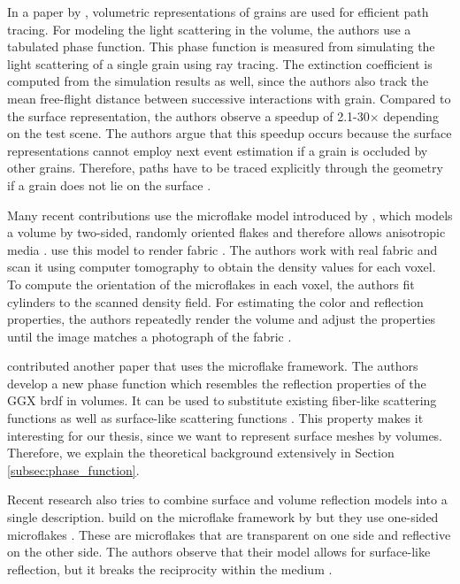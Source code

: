 In a paper by \citeauthor{meng_multi_scale_modeling_and_rendering_of_granular_materials}, volumetric representations of grains are used for efficient path tracing.
For modeling the light scattering in the volume, the authors use a tabulated phase function.
This phase function is measured from simulating the light scattering of a single grain using ray tracing.
The extinction coefficient is computed from the simulation results as well, since the authors also track the mean free-flight distance between successive interactions with grain.
Compared to the surface representation, the authors observe a speedup of 2.1-30$\times$ depending on the test scene.
The authors argue that this speedup occurs because the surface representations cannot employ next event estimation if a grain is occluded by other grains.
Therefore, paths have to be traced explicitly through the geometry if a grain does not lie on the surface \cite{meng_multi_scale_modeling_and_rendering_of_granular_materials}.

Many recent contributions use the microflake model introduced by \citeauthor{microflake}, which models a volume by two-sided, randomly oriented flakes and therefore allows anisotropic media \cite{microflake}.
\citeauthor{zhao_building_volumetric_appearance_models} use this model to render fabric \cite{zhao_building_volumetric_appearance_models}.
The authors work with real fabric and scan it using computer tomography to obtain the density values for each voxel.
To compute the orientation of the microflakes in each voxel, the authors fit cylinders to the scanned density field.
For estimating the color and reflection properties, the authors repeatedly render the volume and adjust the properties until the image matches a photograph of the fabric \cite{zhao_building_volumetric_appearance_models}.

\citeauthor{sggx} contributed another paper that uses the microflake framework.
The authors develop a new phase function which resembles the reflection properties of the GGX \ac{brdf} in volumes.
It can be used to substitute existing fiber-like scattering functions as well as surface-like scattering functions \cite{sggx}.
This property makes it interesting for our thesis, since we want to represent surface meshes by volumes.
Therefore, we explain the theoretical background extensively in Section \ref{subsec:phase_function}.

Recent research also tries to combine surface and volume reflection models into a single description.
\citeauthor{dupuy_unification_of_microfacet_and_microflake} build on the microflake framework by \citeauthor{microflake} but they use one-sided microflakes \cite{dupuy_unification_of_microfacet_and_microflake}.
These are microflakes that are transparent on one side and reflective on the other side.
The authors observe that their model allows for surface-like reflection, but it breaks the reciprocity within the medium \cite{dupuy_unification_of_microfacet_and_microflake}.


